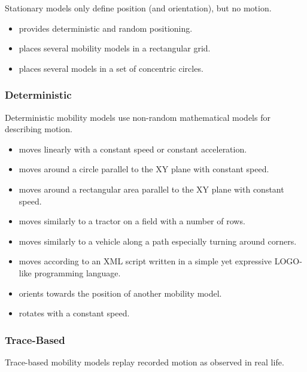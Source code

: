 Stationary models only define position (and orientation), but no motion.

\begin{itemize}
    \item {} provides deterministic and random positioning.
    \item {} places several mobility models in a rectangular grid.
    \item {} places several models in a set of concentric circles.
\end{itemize}

\subsubsection*{Deterministic}

Deterministic mobility models use non-random mathematical models for describing motion.

\begin{itemize}
    \item {} moves linearly with a constant speed or constant acceleration.
    \item {} moves around a circle parallel to the XY plane with constant speed.
    \item {} moves around a rectangular area parallel to the XY plane with constant speed.
    \item {} moves similarly to a tractor on a field with a number of rows.
    \item {} moves similarly to a vehicle along a path especially turning around corners.
    \item {} moves according to an XML script written in a simple yet expressive LOGO-like programming language.
    \item {} orients towards the position of another mobility model.
    \item {} rotates with a constant speed.
\end{itemize}

\subsubsection*{Trace-Based}

Trace-based mobility models replay recorded motion as observed in real life.

